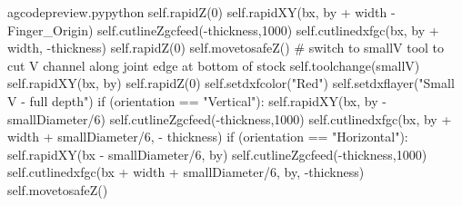 \documentclass{ltxdoc}
\begin{document}
\begin{writecode}{a}{gcodepreview.py}{python}
            self.rapidZ(0)
            self.rapidXY(bx, by + width - Finger_Origin)
            self.cutlineZgcfeed(-thickness,1000)
            self.cutlinedxfgc(bx, by + width, -thickness)
            self.rapidZ(0)
        self.movetosafeZ()
    # switch to smallV tool to cut V channel along joint edge at bottom of stock
        self.toolchange(smallV)
        self.rapidXY(bx, by)
        self.rapidZ(0)
        self.setdxfcolor("Red")
        self.setdxflayer("Small V - full depth")
        if (orientation == "Vertical"):
            self.rapidXY(bx, by - smallDiameter/6)
            self.cutlineZgcfeed(-thickness,1000)
            self.cutlinedxfgc(bx, by + width + smallDiameter/6, - thickness)
        if (orientation == "Horizontal"):
            self.rapidXY(bx - smallDiameter/6, by)
            self.cutlineZgcfeed(-thickness,1000)
            self.cutlinedxfgc(bx + width + smallDiameter/6, by, -thickness)
        self.movetosafeZ()

\end{writecode}
\addtocounter{gcpy}{294}
\end{document}
